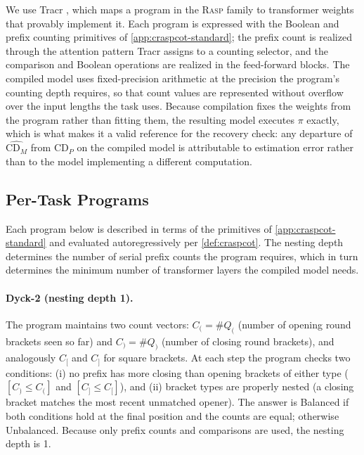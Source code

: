 \documentclass[11pt]{article}
\newcommand{\CDP}{\mathrm{CD}_{P}}
\newcommand{\CDM}{\mathrm{CD}_{M}}
\begin{document}
We use Tracr \citep{DBLP:conf/nips/LindnerKFRMM23}, which maps a program in the
\textsc{Rasp} family to transformer weights that provably implement it. Each
program is expressed with the Boolean and prefix counting primitives of
\cref{app:craspcot-standard}; the prefix count is realized through the
attention pattern Tracr assigns to a counting selector, and the comparison and
Boolean operations are realized in the feed-forward blocks. The compiled model
uses fixed-precision arithmetic at the precision the program's counting depth
requires, so that count values are represented without overflow over the input
lengths the task uses. Because compilation fixes the weights from the program
rather than fitting them, the resulting model executes $\pi$ exactly, which is
what makes it a valid reference for the recovery check: any departure of
$\widehat{\CDM}$ from $\CDP$ on the compiled model is attributable to
estimation error rather than to the model implementing a different computation.

\subsection{Per-Task Programs}
\label{app:compile-pertask}

Each program below is described in terms of the primitives of
\cref{app:craspcot-standard} and evaluated autoregressively per
\cref{def:craspcot}. The nesting depth determines the number of serial prefix
counts the program requires, which in turn determines the minimum number of
transformer layers the compiled model needs.

\paragraph{Dyck-2 (nesting depth 1).}
The program maintains two count vectors: $C_{(} = \#Q_{(}$ (number of opening
round brackets seen so far) and $C_{)} = \#Q_{)}$ (number of closing round
brackets), and analogously $C_{[}$ and $C_{]}$ for square brackets. At each
step the program checks two conditions: (i) no prefix has more closing than
opening brackets of either type ($[C_{)} \le C_{(}]$ and $[C_{]} \le C_{[}]$),
and (ii) bracket types are properly nested (a closing bracket matches the most
recent unmatched opener). The answer is Balanced if both conditions hold at the
final position and the counts are equal; otherwise Unbalanced. Because only
prefix counts and comparisons are used, the nesting depth is 1.
\end{document}
